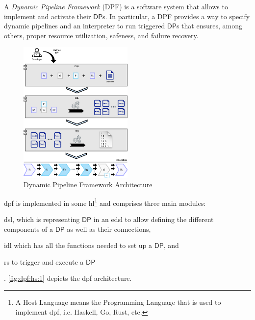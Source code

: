 \documentclass[preprint]{elsarticle}
\newcommand{\DP}{\mathsf{DP}}
\begin{document}
%
 
%
A \textit{Dynamic Pipeline Framework} (DPF) is a software system that allows to implement and activate their $\DP$s. In particular, a DPF provides a way to specify dynamic pipelines and an interpreter to run triggered $\DP$s that ensures, among others, proper resource utilization, safeness, and failure recovery.
\begin{figure}
  \begin{center}
     \includegraphics[width=0.5\textwidth] {dpf_haskell_v3.png}
       \end{center}
     \caption{Dynamic Pipeline Framework Architecture}
     \label{fig:dpf:hs:1}
 \end{figure}

\acrshort{dpf} is implemented in some \acrfull{hl}\footnote{A Host Language means the Programming Language that is used to implement \acrshort{dpf}, i.e. Haskell, Go, Rust, etc.} and comprises three main modules: \begin{inparaenum}[i\upshape)]
\item \acrfull{dsl}, which is representing $\DP$ in an \acrfull{edsl} to allow defining the different components of a $\DP$ as well as their connections, 
\item \acrfull{idl} which has all the functions needed to set up a $\DP$,  and \item \acrfull{rs} to trigger and execute a $\DP$\end{inparaenum}.  \autoref{fig:dpf:hs:1} depicts the \acrshort{dpf}  architecture. 
\end{document}
